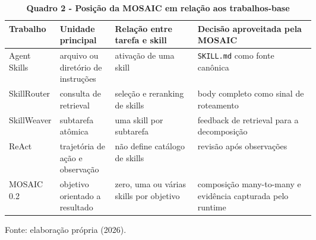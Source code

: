 \begin{table}[H]
\centering
\caption*{\textbf{Quadro 2 - Posição da MOSAIC em relação aos trabalhos-base}}
\footnotesize
\renewcommand{\arraystretch}{1.16}
\begin{tabularx}{\linewidth}{|p{0.15\linewidth}|p{0.18\linewidth}|p{0.27\linewidth}|Y|}
\hline
\textbf{Trabalho} & \textbf{Unidade principal} &
\textbf{Relação entre tarefa e skill} & \textbf{Decisão aproveitada pela MOSAIC} \\
\hline
Agent Skills & arquivo ou diretório de instruções & ativação de uma skill &
\texttt{SKILL.md} como fonte canônica \\
\hline
SkillRouter & consulta de retrieval & seleção e reranking de skills &
body completo como sinal de roteamento \\
\hline
SkillWeaver & subtarefa atômica & uma skill por subtarefa &
feedback de retrieval para a decomposição \\
\hline
ReAct & trajetória de ação e observação & não define catálogo de skills &
revisão após observações \\
\hline
MOSAIC 0.2 & objetivo orientado a resultado & zero, uma ou várias skills por objetivo &
composição many-to-many e evidência capturada pelo runtime \\
\hline
\end{tabularx}
\par\smallskip\raggedright\small Fonte: elaboração própria (2026).
\end{table}
